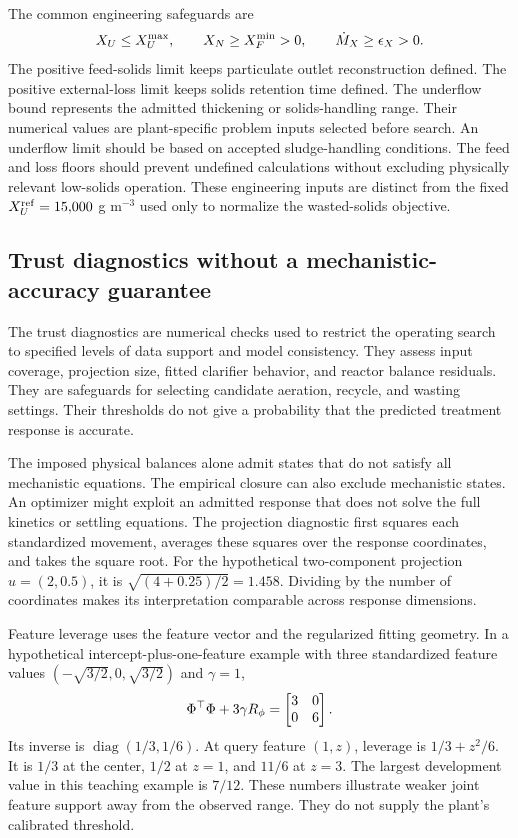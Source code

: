 The common engineering safeguards are
\begin{equation}
\equationname{Underflow, feed-solids, and external-loss safeguards}
X_U\le X_U^{\max},\qquad X_N\ge X_F^{\min}>0,\qquad
\dot M_X\ge\epsilon_X>0.
\label{eq:plant_engineering_safeguards}
\end{equation}
The positive feed-solids limit keeps particulate outlet reconstruction defined. The positive external-loss limit keeps solids retention time defined. The underflow bound represents the admitted thickening or solids-handling range. Their numerical values are plant-specific problem inputs selected before search. An underflow limit should be based on accepted sludge-handling conditions. The feed and loss floors should prevent undefined calculations without excluding physically relevant low-solids operation. These engineering inputs are distinct from the fixed $X_U^{\rm ref}=15{,}000$ g m$^{-3}$ used only to normalize the wasted-solids objective.

\subsection{Trust diagnostics without a mechanistic-accuracy guarantee}

The trust diagnostics are numerical checks used to restrict the operating search to specified levels of data support and model consistency. They assess input coverage, projection size, fitted clarifier behavior, and reactor balance residuals. They are safeguards for selecting candidate aeration, recycle, and wasting settings. Their thresholds do not give a probability that the predicted treatment response is accurate.

The imposed physical balances alone admit states that do not satisfy all mechanistic equations. The empirical closure can also exclude mechanistic states. An optimizer might exploit an admitted response that does not solve the full kinetics or settling equations. The projection diagnostic first squares each standardized movement, averages these squares over the response coordinates, and takes the square root. For the hypothetical two-component projection $u=(2,0.5)$, it is $\sqrt{(4+0.25)/2}=1.458$. Dividing by the number of coordinates makes its interpretation comparable across response dimensions.

Feature leverage uses the feature vector and the regularized fitting geometry. In a hypothetical intercept-plus-one-feature example with three standardized feature values $(-\sqrt{3/2},0,\sqrt{3/2})$ and $\gamma=1$,
\begin{equation}
\equationname{Illustrative regularized feature Gram matrix}
\Phi^\top\Phi+3\gamma R_\phi=
\begin{bmatrix}3&0\\0&6\end{bmatrix}.
\end{equation}
Its inverse is $\operatorname{diag}(1/3,1/6)$. At query feature $(1,z)$, leverage is $1/3+z^2/6$. It is $1/3$ at the center, $1/2$ at $z=1$, and $11/6$ at $z=3$. The largest development value in this teaching example is $7/12$. These numbers illustrate weaker joint feature support away from the observed range. They do not supply the plant's calibrated threshold.

